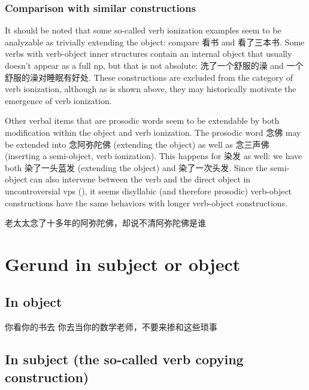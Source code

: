 \documentclass[UTF8, a4paper, oneside, scheme=plain, 12pt]{ctexrep}
\begin{document}
\subsubsection{Comparison with similar constructions}\label{sec:verb-phrase.ionization.similar}

It should be noted that some so-called verb ionization examples 
seem to be analyzable as 
trivially extending the object: 
compare 看书 and 看了三本书.
Some verbs with verb-object inner structures 
contain an internal object that usually doesn't appear as a full \acs{np}, 
but that is not absolute: 
洗了一个舒服的澡 and 一个舒服的澡对睡眠有好处.
These constructions are excluded from the category of verb ionization,
although as is shown above, 
they may historically motivate the emergence of verb ionization.

Other verbal items that are prosodic words
seem to be extendable by 
both modification within the object 
and verb ionization.
The prosodic word 念佛 may be extended into 念阿弥陀佛 (extending the object)
as well as 念三声佛 (inserting a semi-object, verb ionization).
This happens for 染发 as well: 
we have both 染了一头蓝发 (extending the object) 
and 染了一次头发.
Since the semi-object can also intervene
between the verb and the direct object in uncontroversial \acs{vp}s 
(), 
it seems disyllabic (and therefore prosodic) verb-object constructions 
have the same behaviors with 
longer verb-object constructions.

\begin{exe}
    \ex\label{ex:verb-phrase.separation.nianfo-full-vp} 老太太念了十多年的阿弥陀佛，却说不清阿弥陀佛是谁
\end{exe}



\section{Gerund in subject or object}

\subsection{In object}

\begin{exe}
    \ex 你看你的书去
    \ex 你去当你的数学老师，不要来掺和这些琐事
\end{exe}

\subsection{In subject (the so-called verb copying construction)}
\end{document}
